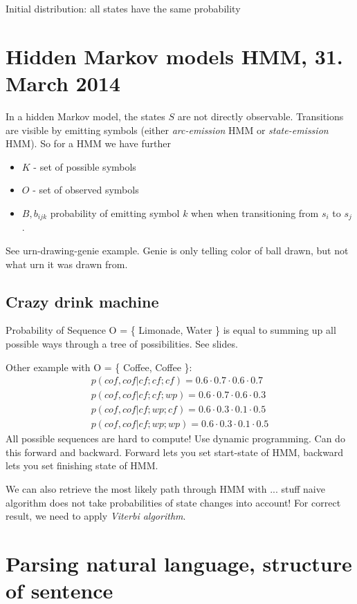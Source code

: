 \documentclass[11pt]{article}
\begin{document}
Initial distribution: all states have the same probability

\section{Hidden Markov models HMM, 31. March 2014}
In a hidden Markov model, the states $S$ are not directly observable. Transitions are visible
by emitting symbols (either \emph{arc-emission} HMM or \emph{state-emission} HMM).
So for a HMM we have further
\begin{itemize}
	\item $K$ - set of possible symbols
	\item $O$ - set of observed symbols
	\item $B, b_{ijk}$ probability of emitting symbol $k$ when when transitioning from 
	$s_i$ to $s_j$.
\end{itemize}

See urn-drawing-genie example. Genie is only telling color of ball drawn, but not what urn
it was drawn from. 

\subsection{Crazy drink machine}
Probability of Sequence O = \{ Limonade, Water \} is equal to summing up all possible ways
through a tree of possibilities. See slides.

Other example with O =  \{ Coffee, Coffee \}:
\begin{eqnarray*}
	p(cof, cof | cf; cf; cf) = 0.6 \cdot 0.7\cdot 0.6 \cdot 0.7 \\
	p(cof, cof | cf; cf; wp) = 0.6 \cdot 0.7\cdot 0.6\cdot0.3 \\
	p(cof, cof | cf; wp; cf) = 0.6 \cdot 0.3\cdot 0.1\cdot 0.5 \\
	p(cof, cof | cf; wp; wp) = 0.6 \cdot 0.3\cdot 0.1\cdot 0.5
\end{eqnarray*}
All possible sequences are hard to compute! Use dynamic programming. Can do this forward
and backward. Forward lets you set start-state of HMM, backward lets you set finishing
state of HMM.

We can also retrieve the most likely path through HMM with ... stuff naive algorithm does
 not take probabilities of state changes into account! For correct result, we need to
 apply \emph{Viterbi algorithm}.
 
\section{Parsing natural language, structure of sentence}
\end{document}
